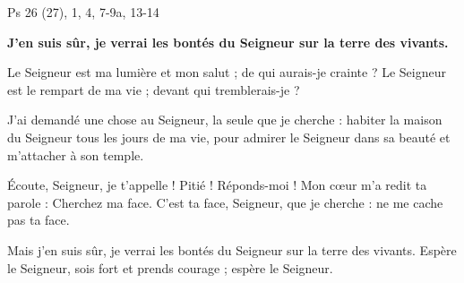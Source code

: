 Ps 26 (27), 1, 4, 7-9a, 13-14

\textbf{
J’en suis sûr, je verrai les bontés du Seigneur
sur la terre des vivants.
}

\smallskip

Le Seigneur est ma lumière et mon salut ;
de qui aurais-je crainte ?
Le Seigneur est le rempart de ma vie ;
devant qui tremblerais-je ?

\smallskip

J’ai demandé une chose au Seigneur,
la seule que je cherche :
habiter la maison du Seigneur
tous les jours de ma vie,
pour admirer le Seigneur dans sa beauté
et m’attacher à son temple.

\smallskip

Écoute, Seigneur, je t’appelle !
Pitié ! Réponds-moi !
Mon cœur m’a redit ta parole :
\og Cherchez ma face. \fg{}
C’est ta face, Seigneur, que je cherche :
ne me cache pas ta face.

\smallskip

Mais j’en suis sûr, je verrai les bontés du Seigneur
sur la terre des vivants.
\og Espère le Seigneur, sois fort et prends courage ;
espère le Seigneur. \fg
